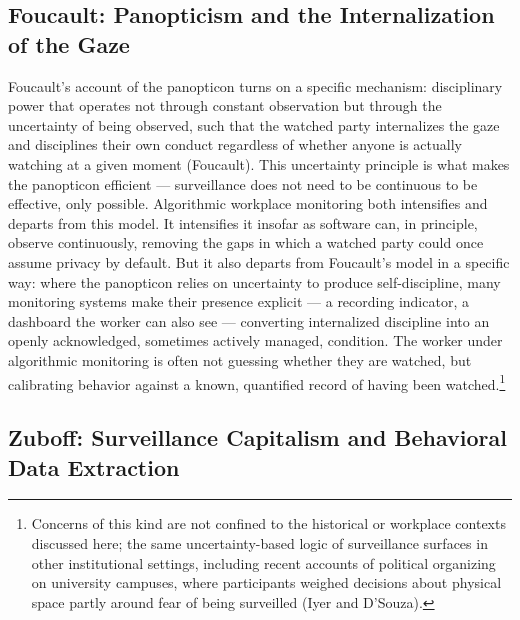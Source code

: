 \documentclass[12pt]{article}
\begin{document}
\subsection{Foucault: Panopticism and the Internalization of the Gaze}

Foucault's account of the panopticon turns on a specific mechanism: disciplinary power that operates not through constant observation but through the uncertainty of being observed, such that the watched party internalizes the gaze and disciplines their own conduct regardless of whether anyone is actually watching at a given moment (Foucault). This uncertainty principle is what makes the panopticon efficient --- surveillance does not need to be continuous to be effective, only possible. Algorithmic workplace monitoring both intensifies and departs from this model. It intensifies it insofar as software can, in principle, observe continuously, removing the gaps in which a watched party could once assume privacy by default. But it also departs from Foucault's model in a specific way: where the panopticon relies on uncertainty to produce self-discipline, many monitoring systems make their presence explicit --- a recording indicator, a dashboard the worker can also see --- converting internalized discipline into an openly acknowledged, sometimes actively managed, condition. The worker under algorithmic monitoring is often not guessing whether they are watched, but calibrating behavior against a known, quantified record of having been watched.\footnote{Concerns of this kind are not confined to the historical or workplace contexts discussed here; the same uncertainty-based logic of surveillance surfaces in other institutional settings, including recent accounts of political organizing on university campuses, where participants weighed decisions about physical space partly around fear of being surveilled (Iyer and D'Souza).}

\subsection{Zuboff: Surveillance Capitalism and Behavioral Data Extraction}
\end{document}
